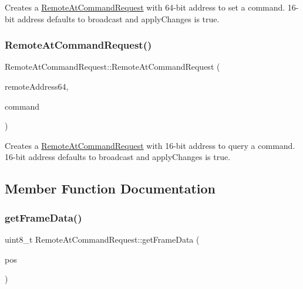 Creates a \hyperlink{class_remote_at_command_request}{Remote\+At\+Command\+Request} with 64-\/bit address to set a command. 16-\/bit address defaults to broadcast and apply\+Changes is true. \hypertarget{class_remote_at_command_request_aa01b3f59d62d444ad78d6f1bbf8124aa}{}\label{class_remote_at_command_request_aa01b3f59d62d444ad78d6f1bbf8124aa} 
\subsubsection{\texorpdfstring{Remote\+At\+Command\+Request()}{RemoteAtCommandRequest()}\hspace{0.1cm}{\footnotesize\ttfamily [4/4]}}
{\footnotesize\ttfamily Remote\+At\+Command\+Request\+::\+Remote\+At\+Command\+Request (\begin{DoxyParamCaption}\item[{\hyperlink{class_x_bee_address64}{X\+Bee\+Address64} \&}]{remote\+Address64,  }\item[{uint8\+\_\+t $\ast$}]{command }\end{DoxyParamCaption})}

Creates a \hyperlink{class_remote_at_command_request}{Remote\+At\+Command\+Request} with 16-\/bit address to query a command. 16-\/bit address defaults to broadcast and apply\+Changes is true. 

\subsection{Member Function Documentation}
\hypertarget{class_remote_at_command_request_a0e576cf564ebd5a82cb2ed05239a856a}{}\label{class_remote_at_command_request_a0e576cf564ebd5a82cb2ed05239a856a} 
\subsubsection{\texorpdfstring{get\+Frame\+Data()}{getFrameData()}}
{\footnotesize\ttfamily uint8\+\_\+t Remote\+At\+Command\+Request\+::get\+Frame\+Data (\begin{DoxyParamCaption}\item[{uint8\+\_\+t}]{pos }\end{DoxyParamCaption})\hspace{0.3cm}{\ttfamily [virtual]}}

